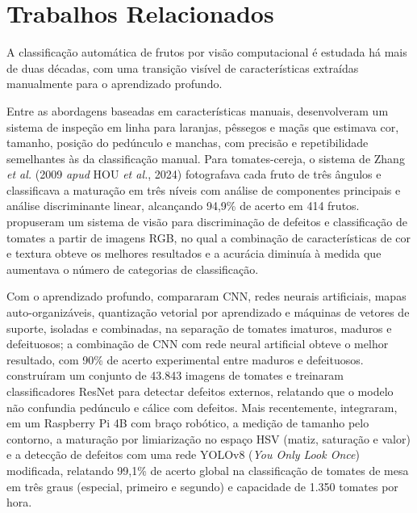 \section{Trabalhos Relacionados}

A classificação automática de frutos por visão computacional é estudada há mais de duas décadas, com uma transição visível de características extraídas manualmente para o aprendizado profundo.

Entre as abordagens baseadas em características manuais, \textcite{blasco2003} desenvolveram um sistema de inspeção em linha para laranjas, pêssegos e maçãs que estimava cor, tamanho, posição do pedúnculo e manchas, com precisão e repetibilidade semelhantes às da classificação manual. Para tomates-cereja, o sistema de Zhang \textit{et al.} (2009 \textit{apud} HOU \textit{et al.}, 2024) fotografava cada fruto de três ângulos e classificava a maturação em três níveis com análise de componentes principais e análise discriminante linear, alcançando 94,9\% de acerto em 414 frutos. \textcite{ireri2019} propuseram um sistema de visão para discriminação de defeitos e classificação de tomates a partir de imagens RGB, no qual a combinação de características de cor e textura obteve os melhores resultados e a acurácia diminuía à medida que aumentava o número de categorias de classificação.

Com o aprendizado profundo, \textcite{haggag2019} compararam CNN, redes neurais artificiais, mapas auto-organizáveis, quantização vetorial por aprendizado e máquinas de vetores de suporte, isoladas e combinadas, na separação de tomates imaturos, maduros e defeituosos; a combinação de CNN com rede neural artificial obteve o melhor resultado, com 90\% de acerto experimental entre maduros e defeituosos. \textcite{dacosta2020} construíram um conjunto de 43.843 imagens de tomates e treinaram classificadores ResNet para detectar defeitos externos, relatando que o modelo não confundia pedúnculo e cálice com defeitos. Mais recentemente, \textcite{hou2024} integraram, em um Raspberry Pi 4B com braço robótico, a medição de tamanho pelo contorno, a maturação por limiarização no espaço HSV (matiz, saturação e valor) e a detecção de defeitos com uma rede YOLOv8 (\textit{You Only Look Once}) modificada, relatando 99,1\% de acerto global na classificação de tomates de mesa em três graus (especial, primeiro e segundo) e capacidade de 1.350 tomates por hora.

